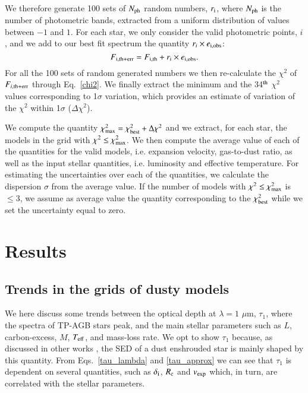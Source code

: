 \documentclass[useAMS,usenatbib]{mn2e/mn2e}
\begin{document}
We therefore generate 100 sets of $N_{\rm ph}$ random numbers, $r_{\rm i}$, where $N_{\rm ph}$ is the number of photometric bands, extracted from a uniform distribution of values between $-1$ and $1$.
For each star, we only consider the valid photometric points, $i$, and we add to our best fit spectrum the quantity $r_i\times e_{\rm i, {\rm obs}}$:
%
\begin{equation}\label{error}
    F_{\rm i,{\rm th+err}}=F_{\rm i, {\rm th}}+ r_{\rm i} \times e_{\rm i, {\rm obs}}.
\end{equation}
For all the 100 sets of random generated numbers we then re-calculate the $\chi^2$ of $F_{i, {\rm th+err}}$ through Eq.~\ref{chi2}.
We finally extract the minimum and the 34$^{\rm th}$ $\chi^2$ values corresponding to 1$\sigma$ variation, which provides an estimate of variation of the $\chi^2$ within 1$\sigma$ ($\Delta\chi^2$).

We compute the quantity $\chi^2_{\rm max}=\chi^2_{\rm best}+\Delta\chi^2$ and we extract, for each star, the models in the grid with $\chi^2 \le \chi^2_{\rm max}$. We then compute the
average value of each of the quantities for the valid models, i.e. expansion velocity, gas-to-dust ratio, as well as the input stellar quantities, i.e. luminosity and effective temperature. 
For estimating the uncertainties over each of the quantities, we calculate the dispersion $\sigma$ from the average value.
If the number of models with  $\chi^2 \le \chi^2_{\rm max}$ is $\le 3$, we assume as average value the quantity corresponding to the $\chi^2_{\rm best}$ while we set the uncertainty equal to zero.

\section{Results}
\label{Results}
\subsection{Trends in the grids of dusty models}\label{trends_tau}
We here discuss some trends between the optical depth at $\lambda=1$ $\mu$m, $\tau_1$, where the spectra of TP-AGB stars peak, and the main stellar parameters such as $L$, carbon-excess, $M$,  $T_{\rm eff}$, and mass-loss rate.
We opt to show $\tau_1$ because, as discussed in other works \citep[e.g., ][]{Bressan98, Nanni16}, the SED of a dust enshrouded star is mainly shaped by this quantity.
From Eqs.~\ref{tau_lambda} and \ref{tau_approx} we can see that $\tau_1$ is dependent on several quantities, such as $\delta_{\rm i}$, $R_{\rm c}$ and $v_{\rm exp}$ which, in turn, are correlated with the stellar parameters.
\end{document}
